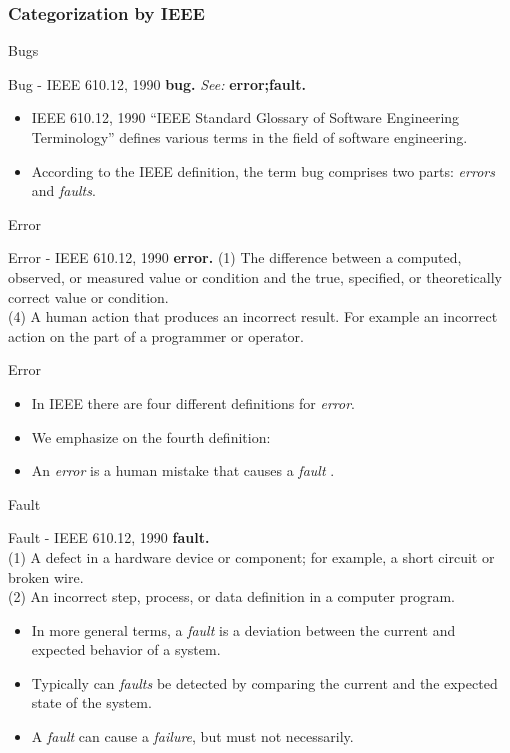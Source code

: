 \subsubsection*{Categorization by IEEE}

\begin{frame}{Bugs}
\begin{block}{Bug - IEEE 610.12, 1990}
\textbf{bug.} \textit{See:} \textbf{error;fault.}
\end{block}
\begin{itemize}
	\item IEEE 610.12, 1990 \enquote{IEEE Standard Glossary of Software Engineering Terminology} defines various terms in the field of software engineering.
	\item According to the IEEE definition, the term bug comprises two parts: \emph{errors} and \emph{faults}.
\end{itemize}
\end{frame}

\begin{frame}{Error}
\begin{block}{Error - IEEE 610.12, 1990}
\textbf{error.} (1) The difference between a computed, observed, or measured value or condition and the true, specified, or theoretically correct value or condition.\\
(4) A human action that produces an incorrect result. For example an incorrect action on the part of a programmer or operator.
\end{block}
\end{frame}

\begin{frame}{Error}
\begin{itemize}
	\item In IEEE there are four different definitions for \emph{error}. 
	\item We emphasize on the fourth definition:
	\item An \emph{error} is a human mistake that causes a \emph{fault} .
\end{itemize}
\end{frame}

\begin{frame}{Fault}

\begin{block}{Fault - IEEE 610.12, 1990}
\textbf{fault.}\\ (1) A defect in a hardware device or component; for example, a short circuit or broken wire.\\
(2) An incorrect step, process, or data definition in a computer program.
\end{block}

\begin{itemize}
	\item In more general terms, a \emph{fault} is a deviation between the current and expected behavior of a system.
	\item Typically can \emph{faults} be detected by comparing the current and the expected state of the system.
	\item A \emph{fault} can cause a \emph{failure}, but must not necessarily.
\end{itemize}
\end{frame}

